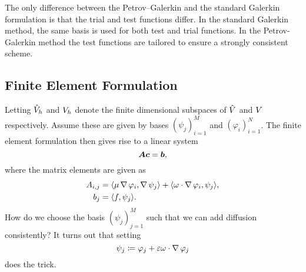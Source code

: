 The only difference between the Petrov--Galerkin and the standard Galerkin
formulation is that the trial and test functions differ. In the standard
Galerkin method, the same basis is used for both test and trial functions.  In
the Petrov-Galerkin method the test functions are tailored to ensure a
strongly consistent scheme.

\subsection{Finite Element Formulation}
\label{sub:finite_element_formulation}

Letting \( \hat{V}_h\) and \(V_h\) denote the finite dimensional subspaces
of \( \hat{V} \) and \( V \) respectively. Assume these are given by bases
\( (\psi_j)_{i=1}^M \) and \( (\varphi_i)_{i=1}^N \).  The finite element
formulation then gives rise to a linear system
\begin{equation}
    \boldsymbol{A} \boldsymbol{c} = \boldsymbol{b},
\end{equation}
where the matrix elements are given as
\begin{align}
    A_{i, j} &= \langle \mu \operatorname{\mathop{}\!\nabla} \varphi_i , \operatorname{\mathop{}\!\nabla} \psi_j \rangle + \langle \omega \cdot \operatorname{\mathop{}\!\nabla} \varphi_i, \psi_j \rangle, \\
    b_j &= \langle f, \psi_j \rangle.
\end{align}
How do we choose the basis \( (\psi_j)_{j=1}^M \) such that we can add
diffusion consistently? It turns out that setting
\begin{equation}
    \psi_j \coloneqq \varphi_j + \varepsilon\omega \cdot \operatorname{\mathop{}\!\nabla} \varphi_j
\end{equation}
does the trick.
